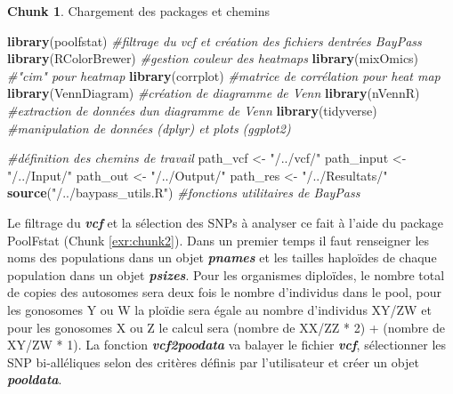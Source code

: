 \documentclass[
  openany]{book}
\newenvironment{Shaded}{\begin{snugshade}}{\end{snugshade}}
\newcommand{\CommentTok}[1]{\textcolor[rgb]{0.56,0.35,0.01}{\textit{#1}}}
\newcommand{\FunctionTok}[1]{\textcolor[rgb]{0.13,0.29,0.53}{\textbf{#1}}}
\newcommand{\NormalTok}[1]{#1}
\newcommand{\OtherTok}[1]{\textcolor[rgb]{0.56,0.35,0.01}{#1}}
\newcommand{\StringTok}[1]{\textcolor[rgb]{0.31,0.60,0.02}{#1}}
\theoremstyle{definition}
\theoremstyle{definition}
\theoremstyle{definition}
\newtheorem{exercise}{Chunk}[chapter]
\theoremstyle{definition}
\theoremstyle{remark}
\begin{document}
\begin{exercise}
\protect\hypertarget{exr:chunk1}{}\label{exr:chunk1}{Chargement des packages et chemins}
\end{exercise}

\begin{Shaded}
\begin{Highlighting}[]
\FunctionTok{library}\NormalTok{(poolfstat)      }\CommentTok{\#filtrage du vcf et création des fichiers d\textquotesingle{}entrées BayPass}
\FunctionTok{library}\NormalTok{(RColorBrewer)   }\CommentTok{\#gestion couleur des heatmaps}
\FunctionTok{library}\NormalTok{(mixOmics)       }\CommentTok{\#"cim" pour heatmap}
\FunctionTok{library}\NormalTok{(corrplot)       }\CommentTok{\#matrice de corrélation pour heat map}
\FunctionTok{library}\NormalTok{(VennDiagram)    }\CommentTok{\#création de diagramme de Venn}
\FunctionTok{library}\NormalTok{(nVennR)         }\CommentTok{\#extraction de données d\textquotesingle{}un diagramme de Venn}
\FunctionTok{library}\NormalTok{(tidyverse)      }\CommentTok{\#manipulation de données (dplyr) et plots (ggplot2)}

\CommentTok{\#définition des chemins de travail}
\NormalTok{path\_vcf }\OtherTok{\textless{}{-}} \StringTok{"/../vcf/"}
\NormalTok{path\_input }\OtherTok{\textless{}{-}} \StringTok{"/../Input/"}
\NormalTok{path\_out }\OtherTok{\textless{}{-}} \StringTok{"/../Output/"}
\NormalTok{path\_res }\OtherTok{\textless{}{-}} \StringTok{"/../Resultats/"}
\FunctionTok{source}\NormalTok{(}\StringTok{"/../baypass\_utils.R"}\NormalTok{)   }\CommentTok{\#fonctions utilitaires de BayPass}
\end{Highlighting}
\end{Shaded}

Le filtrage du \textbf{\emph{vcf}} et la sélection des SNPs à analyser ce fait à l'aide du package PoolFstat (Chunk \ref{exr:chunk2}). Dans un premier temps il faut renseigner les noms des populations dans un objet \textbf{\emph{pnames}} et les tailles haploïdes de chaque population dans un objet \textbf{\emph{psizes}}. Pour les organismes diploïdes, le nombre total de copies des autosomes sera deux fois le nombre d'individus dans le pool, pour les gonosomes Y ou W la ploïdie sera égale au nombre d'individus XY/ZW et pour les gonosomes X ou Z le calcul sera (nombre de XX/ZZ * 2) + (nombre de XY/ZW * 1).
La fonction \textbf{\emph{vcf2poodata}} va balayer le fichier \textbf{\emph{vcf}}, sélectionner les SNP bi-alléliques selon des critères définis par l'utilisateur et créer un objet \textbf{\emph{pooldata}}.
\end{document}
